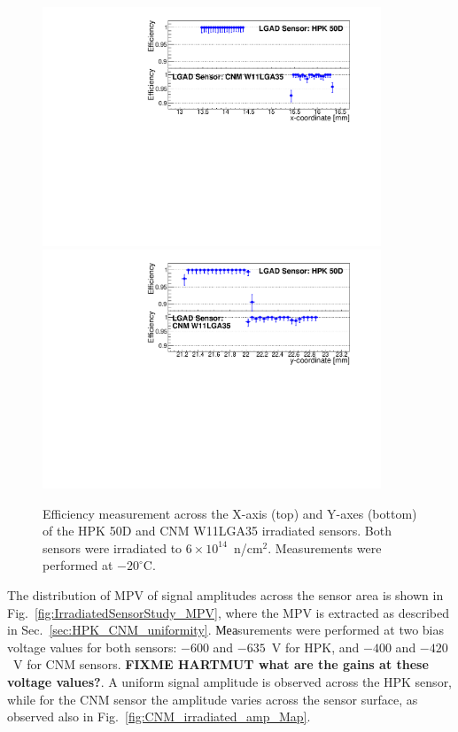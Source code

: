 \documentclass[preprint,1p]{elsarticle}
\begin{document}
\begin{figure}[htbp] 
\centering
\includegraphics[width=0.90\textwidth]{figs/USCSBoard_HPK50DIrradiated-CNMW11LGA35_Run936-961/IrradiatedSensorStudy_Efficiency_vs_X.pdf} 
\includegraphics[width=0.90\textwidth]{figs/USCSBoard_HPK50DIrradiated-CNMW11LGA35_Run936-961/IrradiatedSensorStudy_Efficiency_vs_Y.pdf} 
\caption{Efficiency measurement across the X-axis (top) and Y-axes (bottom) of the HPK 50D and CNM W11LGA35 irradiated sensors. Both sensors were irradiated to $6\times 10^{14}$~n/cm$^2$. Measurements were performed at $-20^{\circ}$C.} 
\label{fig:IrradiatedSensorStudy_Efficiency} 
\end{figure} 

The distribution of MPV of signal amplitudes across the sensor area is shown in
Fig.~\ref{fig:IrradiatedSensorStudy_MPV}, where the MPV is extracted as
described in Sec.~\ref{sec:HPK_CNM_uniformity}. Меаsurements were performed at
two bias voltage values for both sensors: $-600$ and $-635$~V for HPK, and
$-400$ and $-420$~V for CNM sensors. \textbf{FIXME HARTMUT what are the gains at
these voltage values?}. A uniform signal amplitude is observed across the HPK
sensor, while for the CNM sensor the amplitude varies across the sensor surface,
as observed also in Fig.~\ref{fig:CNM_irradiated_amp_Map}. 
\end{document}
